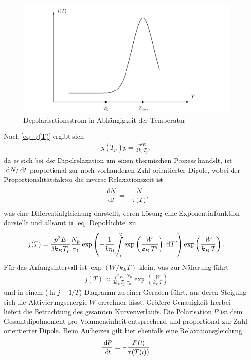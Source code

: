 \begin{figure}[H]
\includegraphics[width=\textwidth]{../pics/i(T).png}
\caption{Depolarisationsstrom in Abhängigkeit der Temperatur}
\label{pic_i(T)}
\end{figure}
Nach \eqref{eq_y(T)} ergibt sich 
\begin{align}
 y(T_p)p=\frac{p^2E}{3k_BT_p},
\end{align}
da es sich bei der Dipolrelaxation um einen thermischen Prozess handelt, ist $\; \mathrm{d} N/\; \mathrm{d} t$ proportional zur noch vorhandenen Zahl orientierter Dipole,
wobei der Proportionalitätsfaktor die inverse Relaxationszeit ist
\begin{align}
 \frac{\; \mathrm{d} N}{\; \mathrm{d} t} = -\frac{N}{\tau(T)},
\end{align}
was eine Differentialgleichung darstellt, deren Lösung eine Exponentialfunktion darstellt und allsamt in \eqref{eq_Depoldichte} zu
\begin{align}
 j(T)=\frac{p^2E}{3k_BT_p}\frac{N_p}{\tau_0}\exp\left(-\frac{1}{b\tau_0}\int\limits_{T_0}^T \exp\left(\frac{W}{k_B\, T'}\right) \; \mathrm{d} T'  \right) \exp\left(\frac{W}{k_B\, T}\right).
 \label{eq_jlang}
 \end{align}
Für das Anfangsintervall ist $\exp(W/k_BT)$ klein, was zur Näherung führt
\begin{align}
 j(T) \approx \frac{p^2E}{3k_BT_p}\frac{N_p}{\tau_0}\exp\left(\frac{W}{k_B\, T}\right)
 \label{eq_j(T)}
\end{align}
und in einem ($\ln j-1/T$)-Diagramm zu einer Geraden führt, aus deren Steigung sich die Aktivierungsenergie $W$ errechnen lässt. Größere Genauigkeit
hierbei liefert die Betrachtung des gesamten Kurvenverlaufs. Die Polarisation $P$ ist dem Gesamtdipolmoment pro Volumeneinheit entsprechend und
proportional zur Zahl orientierter Dipole. Beim Aufheizen gilt hier ebenfalls eine Relaxationsgleichung
\begin{align}
 \frac{\; \mathrm{d} P}{\; \mathrm{d} t} = - \frac{P(t)}{\tau(T(t))}.
\end{align}
